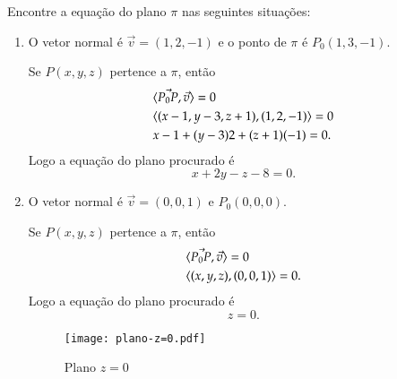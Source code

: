 \begin{exemplos}
    Encontre a equa\c{c}\~ao do plano $\pi$ nas seguintes situa\c{c}\~oes:
    \begin{enumerate}
        \item O vetor normal \'e $\vec{v} = (1,2,-1)$ e o ponto de $\pi$ \'e $P_0(1,3,-1)$.
        \begin{solucao}
            Se $P(x,y,z)$ pertence a $\pi$, ent\~ao
            \begin{align*}
                &\langle \vec{P_0P}, \vec{v} \rangle = 0\\
                &\langle(x - 1, y - 3, z + 1), (1,2,-1)\rangle = 0\\
                &x - 1 + (y - 3)2 + (z + 1)(-1) = 0.
            \end{align*}
            Logo a equa\c{c}\~ao do plano procurado \'e
            \[
                x + 2y - z - 8 = 0.
            \]
        \end{solucao}
        \item O vetor normal \'e $\vec{v} = (0,0,1)$ e $P_0(0,0,0)$.
        \begin{solucao}
            Se $P(x,y,z)$ pertence a $\pi$, ent\~ao
            \begin{align*}
                &\langle \vec{P_0P}, \vec{v} \rangle = 0\\
                &\langle(x, y, z), (0,0,1)\rangle = 0.
            \end{align*}
            Logo a equa\c{c}\~ao do plano procurado \'e
            \[
                z = 0.
            \]
            \begin{figure}[!h]
                \centering
                \caption{Plano $z = 0$}
                \texttt{[image: plano-z=0.pdf]}

\end{figure}
\end{solucao}
\end{enumerate}
\end{exemplos}
